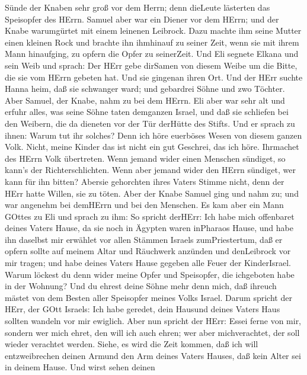 Sünde der Knaben sehr groß vor dem Herrn; denn dieLeute lästerten das
Speisopfer des HErrn.  Samuel aber war ein Diener vor dem
HErrn; und der Knabe warumgürtet mit einem leinenen Leibrock.
 Dazu machte ihm seine Mutter einen kleinen Rock und
brachte ihn ihmhinauf zu seiner Zeit, wenn sie mit ihrem Mann
hinaufging, zu opfern die Opfer zu seinerZeit.  Und Eli
segnete Elkana und sein Weib und sprach: Der HErr gebe dirSamen von
diesem Weibe um die Bitte, die sie vom HErrn gebeten hat. Und sie
gingenan ihren Ort.  Und der HErr suchte Hanna heim, daß
sie schwanger ward; und gebardrei Söhne und zwo Töchter. Aber Samuel,
der Knabe, nahm zu bei dem HErrn.  Eli aber war sehr alt
und erfuhr alles, was seine Söhne taten demganzen Israel, und daß sie
schliefen bei den Weibern, die da dieneten vor der Tür derHütte des
Stifts.  Und er sprach zu ihnen: Warum tut ihr solches?
Denn ich höre euerböses Wesen von diesem ganzen Volk. 
Nicht, meine Kinder das ist nicht ein gut Geschrei, das ich höre.
Ihrmachet des HErrn Volk übertreten.  Wenn jemand wider
einen Menschen sündiget, so kann's der Richterschlichten. Wenn aber
jemand wider den HErrn sündiget, wer kann für ihn bitten? Abersie
gehorchten ihres Vaters Stimme nicht, denn der HErr hatte Willen, sie zu
töten.  Aber der Knabe Samuel ging und nahm zu; und war
angenehm bei demHErrn und bei den Menschen.  Es kam aber
ein Mann GOttes zu Eli und sprach zu ihm: So spricht derHErr: Ich habe
mich offenbaret deines Vaters Hause, da sie noch in Ägypten waren
inPharaos Hause,  und habe ihn daselbst mir erwählet vor
allen Stämmen Israels zumPriestertum, daß er opfern sollte auf meinem
Altar und Räuchwerk anzünden und denLeibrock vor mir tragen; und habe
deines Vaters Hause gegeben alle Feuer der KinderIsrael. 
Warum löckest du denn wider meine Opfer und Speisopfer, die ichgeboten
habe in der Wohnung? Und du ehrest deine Söhne mehr denn mich, daß
ihreuch mästet von dem Besten aller Speisopfer meines Volks Israel.
 Darum spricht der HErr, der GOtt Israels: Ich habe
geredet, dein Hausund deines Vaters Haus sollten wandeln vor mir
ewiglich. Aber nun spricht der HErr: Essei ferne von mir, sondern wer
mich ehret, den will ich auch ehren; wer aber michverachtet, der soll
wieder verachtet werden.  Siehe, es wird die Zeit kommen,
daß ich will entzweibrechen deinen Armund den Arm deines Vaters Hauses,
daß kein Alter sei in deinem Hause.  Und wirst sehen deinen
